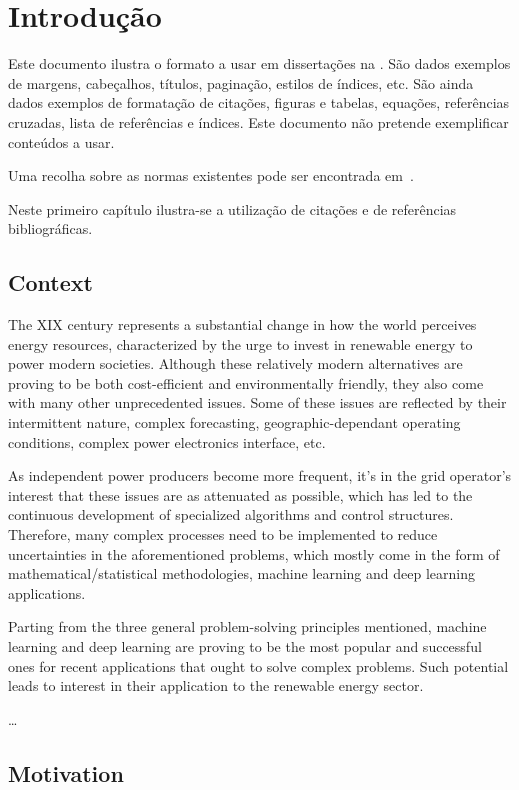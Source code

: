 \chapter{Introdução} \label{chap:intro}

Este documento ilustra o formato a usar em dissertações na \Feup.
São dados exemplos de margens, cabeçalhos, títulos, paginação, estilos
de índices, etc. 
São ainda dados exemplos de formatação de citações, figuras e tabelas,
equações, referências cruzadas, lista de referências e índices.
Este documento não pretende exemplificar conteúdos a usar.

Uma recolha sobre as normas existentes pode ser encontrada em~\citet{kn:Mat93}.

Neste primeiro capítulo ilustra-se a utilização de citações e de
referências bibliográficas.

\section{Context} \label{sec:context}

The XIX century represents a substantial change in how the world perceives
energy resources, characterized by the urge to invest in renewable energy to 
power modern societies. Although these relatively modern alternatives are
proving to be both cost-efficient and environmentally friendly, they also come
with many other unprecedented issues.
Some of these issues are reflected by their intermittent nature, complex
forecasting, geographic-dependant operating conditions, complex power
electronics interface, etc.

As independent power producers become more frequent, it's in the grid operator's
interest that these issues are as attenuated as possible, which has led to the
continuous development of specialized algorithms and control structures.
Therefore, many complex processes need to be implemented to reduce uncertainties
in the aforementioned problems, which mostly come in the form of
mathematical/statistical methodologies, machine learning and deep learning
applications.

Parting from the three general problem-solving principles mentioned, machine
learning and deep learning are proving to be the most popular and successful
ones for recent applications that ought to solve complex problems. Such
potential leads to interest in their application to the renewable energy sector.

\dots

\section{Motivation} \label{sec:motivation}

